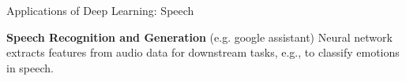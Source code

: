\begin{frame} {Applications of Deep Learning: Speech}
\begin{figure}
\centering
{}
\end{figure}
\textbf{Speech Recognition and Generation} (e.g. google assistant)
Neural network extracts features from audio data for downstream tasks, e.g., to classify emotions in speech.
\end{frame}

\endlecture
